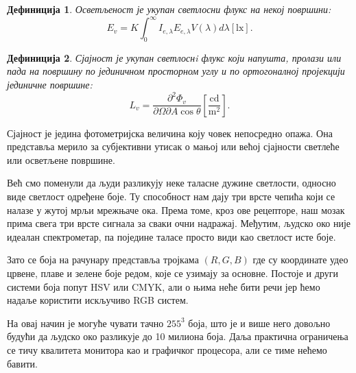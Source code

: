\documentclass[12pt, a4paper, twoside]{book}
\numberwithin{equation}{chapter}
\numberwithin{theorem}{section}
\newtheorem{definition}{Дефиниција}
\numberwithin{definition}{section}
\numberwithin{definitionChapter}{chapter}
\begin{document}
\begin{definition}
	Осветљеност је укупан светлосни флукс на некој површини:
	$$E_v = K\int_{0}^{\infty}I_{e, \lambda}E_{e, \lambda}V(\lambda)d\lambda \left[\mathrm{lx}\right].$$
\end{definition}

\begin{definition}
	Сјајност је укупан светлоснi флукс који напушта, пролази или пада на површину по јединичном просторном
	углу и по ортогоналној пројекцији јединичне површине:
	$$L_v = \frac{\partial^2\Phi_v}{\partial\Omega\partial A \cos\theta} \left[\mathrm{\frac{cd}{m^2}}\right].$$
\end{definition}

Сјајност је једина фотометријска величина коју човек непосредно опажа. Она представља мерило за субјективни утисак
о мањој или већој сјајности светлеће или осветљене површине.

Већ смо поменули да људи разликују неке таласне дужине светлости, односно виде светлост одређене боје. Ту
способност нам дају три врсте чепића који се налазе у жутој мрљи мрежњаче ока. Према томе, кроз ове рецепторе,
наш мозак прима свега три врсте сигнала за сваки очни надражај. Међутим, људско око није идеалан спектрометар, па
поједине таласе просто види као светлост исте боје.

Зато се боја на рачунару представља тројкама $(R, G, B)$ где су координате удео црвене, плаве и зелене боје редом, које
се узимају за основне. Постоје и други системи боја попут HSV или CMYK, али о њима неће бити речи јер ћемо надаље
користити искључиво RGB систем.

На овај начин је могуће чувати тачно $255^3$ боја, што је и више него довољно будући да људско око разликује до 10
милиона боја. Даља практична ограничења се тичу квалитета монитора као и графичког процесора, али се тиме нећемо бавити.


\end{document}
